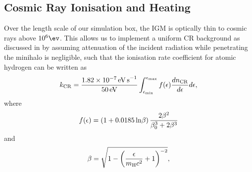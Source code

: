 \subsection{Cosmic Ray Ionisation and Heating}
\label{CRchem}
Over the length scale of our simulation box, the IGM is optically thin to cosmic rays above $10^6\ev$. This allows us to implement a uniform CR background as discussed in  by assuming attenuation of the incident radiation while penetrating the minihalo is negligible, such that the ionisation rate coefficient for atomic hydrogen \citep{Schlickeiser2002} can be written as
\begin{equation}
k_{\rm \small CR} = \frac{1.82\times10^{-7}\,{\rm \small eV\,s}^{-1}}{50\,{\rm \small eV}} 
    \int_{\epsilon_{\rm min}}^{\epsilon_{\rm max}} f(\epsilon) \frac{dn_{\rm \tiny CR}}{d\epsilon} d\epsilon,
\end{equation}
where
\begin{equation}    
    f(\epsilon) = (1 + 0.0185 \,{\rm ln}\beta )\, \frac{2 \beta^2}{\beta_0^3 + 2 \beta^3}
\end{equation}
and
\begin{equation}
    \beta =  \sqrt{1 - \left( \frac{\epsilon}{m_{\rm \tiny H}c^2}+1 \right)^{-2}},
\end{equation}
